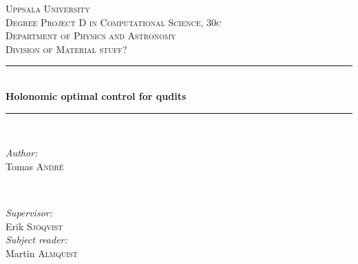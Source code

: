 \documentclass[a4paper, 12pt]{article}
\newcommand{\HRule}{\rule{\linewidth}{0.5mm}} %
\begin{document}
\begin{titlepage}


\center %
 
 
 
 

\textsc{\LARGE Uppsala University}\\[1.5cm] %
\textsc{\Large Degree Project D in Computational Science, 30c}\\[0.5cm] %
\textsc{\large Department of Physics and Astronomy\\ Division of Material stuff?}\\[0.5cm] %


\HRule \\[0.4cm]
{ \huge \bfseries Holonomic optimal control for qudits}\\[0.4cm] %
\HRule \\[1.5cm]
 

\begin{minipage}{0.4\textwidth}
\begin{flushleft} \large
\emph{Author:}\\
Tomas \textsc{André} %
\end{flushleft}
\end{minipage}
~
\begin{minipage}{0.4\textwidth}
\begin{flushright} \large
\emph{Supervisor:} \\
Erik \textsc{Sjöqvist} \\
\emph{Subject reader:} \\
Martin \textsc{Almquist} %
\end{flushright}
\end{minipage}\\[2cm]


\end{titlepage}
\end{document}
